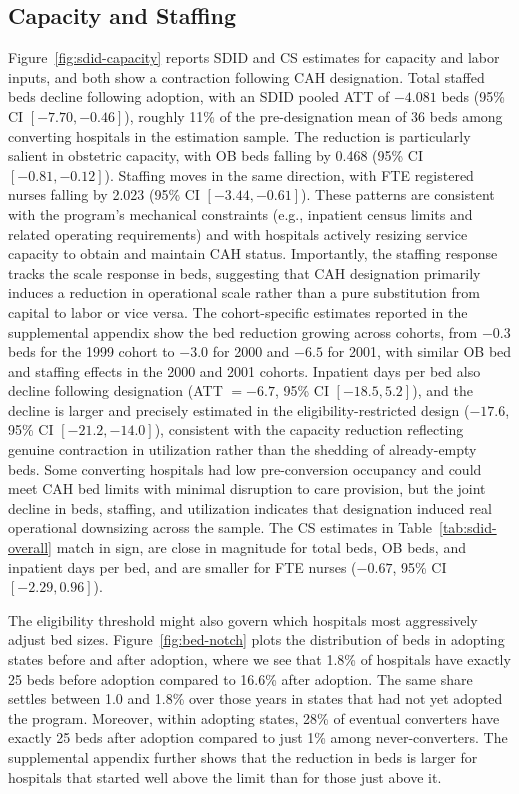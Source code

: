 \documentclass[a4paper, 12pt, twoside]{article}
\begin{document}
\subsection{Capacity and Staffing}
\label{sec:capacity}
Figure~\ref{fig:sdid-capacity} reports SDID and CS estimates for capacity and labor inputs, and both show a contraction following CAH designation. Total staffed beds decline following adoption, with an SDID pooled ATT of $-4.081$ beds (95\% CI $[-7.70, -0.46]$), roughly 11\% of the pre-designation mean of 36 beds among converting hospitals in the estimation sample. The reduction is particularly salient in obstetric capacity, with OB beds falling by 0.468 (95\% CI $[-0.81, -0.12]$). Staffing moves in the same direction, with FTE registered nurses falling by 2.023 (95\% CI $[-3.44, -0.61]$). These patterns are consistent with the program's mechanical constraints (e.g., inpatient census limits and related operating requirements) and with hospitals actively resizing service capacity to obtain and maintain CAH status. Importantly, the staffing response tracks the scale response in beds, suggesting that CAH designation primarily induces a reduction in operational scale rather than a pure substitution from capital to labor or vice versa. The cohort-specific estimates reported in the supplemental appendix show the bed reduction growing across cohorts, from $-0.3$ beds for the 1999 cohort to $-3.0$ for 2000 and $-6.5$ for 2001, with similar OB bed and staffing effects in the 2000 and 2001 cohorts. Inpatient days per bed also decline following designation (ATT $= -6.7$, 95\% CI $[-18.5, 5.2]$), and the decline is larger and precisely estimated in the eligibility-restricted design ($-17.6$, 95\% CI $[-21.2, -14.0]$), consistent with the capacity reduction reflecting genuine contraction in utilization rather than the shedding of already-empty beds. Some converting hospitals had low pre-conversion occupancy and could meet CAH bed limits with minimal disruption to care provision, but the joint decline in beds, staffing, and utilization indicates that designation induced real operational downsizing across the sample. The CS estimates in Table~\ref{tab:sdid-overall} match in sign, are close in magnitude for total beds, OB beds, and inpatient days per bed, and are smaller for FTE nurses ($-0.67$, 95\% CI $[-2.29, 0.96]$).

The eligibility threshold might also govern which hospitals most aggressively adjust bed sizes. Figure~\ref{fig:bed-notch} plots the distribution of beds in adopting states before and after adoption, where we see that 1.8\% of hospitals have exactly 25 beds before adoption compared to 16.6\% after adoption. The same share settles between 1.0 and 1.8\% over those years in states that had not yet adopted the program. Moreover, within adopting states, 28\% of eventual converters have exactly 25 beds after adoption compared to just 1\% among never-converters. The supplemental appendix further shows that the reduction in beds is larger for hospitals that started well above the limit than for those just above it.
\end{document}

